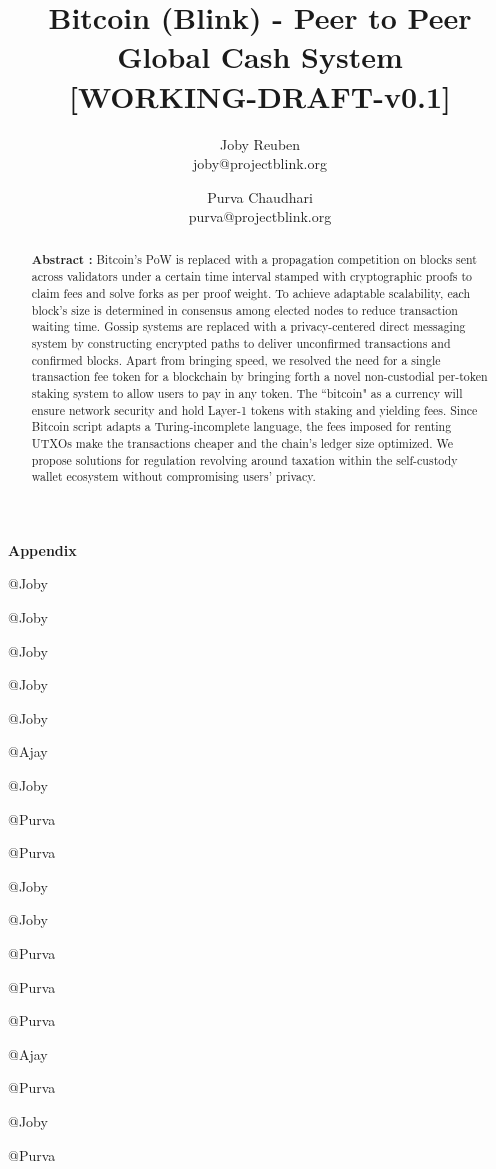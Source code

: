 \documentclass[a4paper,10pt]{article}
\title{
 \large \textbf{Bitcoin (Blink) - Peer to Peer Global Cash System}\\
\vspace{6mm}
\scriptsize[WORKING-DRAFT-v0.1]
}
\author{ \myfontt Joby Reuben \\ \myfontt joby@projectblink.org \and  \myfontt Purva Chaudhari \\ \myfontt purva@projectblink.org}
\date{}
\begin{document}
\maketitle
\begin{abstract}
\noindent \textbf{Abstract :} Bitcoin's PoW is replaced with a propagation competition on blocks sent across validators under a certain time interval stamped with cryptographic proofs to claim fees and solve forks as per proof weight. To achieve adaptable scalability, each block's size is determined in consensus among elected nodes to reduce transaction waiting time. Gossip systems are replaced with a privacy-centered direct messaging system by constructing encrypted paths to deliver unconfirmed transactions and confirmed blocks. Apart from bringing speed, we resolved the need for a single transaction fee token for a blockchain by bringing forth a novel non-custodial per-token staking system to allow users to pay in any token. The ``bitcoin" as a currency will ensure network security and hold Layer-1 tokens with staking and yielding fees. Since Bitcoin script adapts a Turing-incomplete language, the fees imposed for renting UTXOs make the transactions cheaper and the chain's ledger size optimized. We propose solutions for regulation revolving around taxation within the self-custody wallet ecosystem without compromising users' privacy. 
\end{abstract}














\vspace{5mm}
\normalsize
\appendix
\noindent \Large \textbf{Appendix}


@Joby

@Joby

@Joby

@Joby

@Joby

@Ajay

@Joby

@Purva

@Purva

@Joby

@Joby


@Purva

@Purva

@Purva


@Ajay

@Purva

@Joby

@Purva
\end{document}
